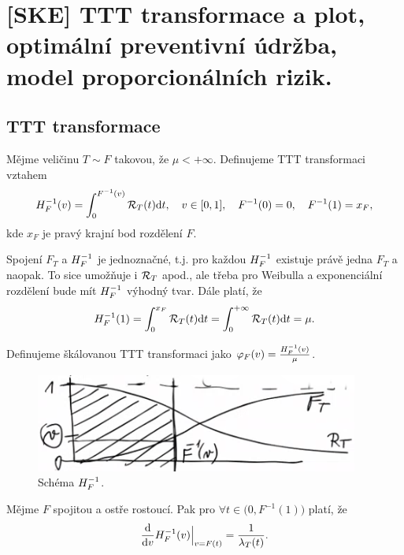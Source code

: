 \chapter{[SKE] TTT transformace a plot, optimální preventivní údržba, model proporcionálních rizik.}


\section{TTT transformace}

    \begin{define}
    Mějme veličinu $T\sim F$ takovou, že $\mu<+\infty$. Definujeme TTT transformaci vztahem $$ H_F^{-1}(v)=\int_{0}^{F^{-1}(v)}\mathcal{R}_T(t)\mathrm{d} t,\quad v\in[0,1],\quad F^{-1}(0)=0,\quad F^{-1}(1)=x_F,$$
    kde $x_F$ je pravý krajní bod rozdělení $F$.
    \end{define}

    \begin{remark}
        Spojení $F_T$ a $H_F^{-1}$ je jednoznačné, t.j. pro každou $H_F^{-1}$ existuje právě jedna $F_T$ a naopak. To sice umožňuje i $\mathcal{R}_T$ apod., ale třeba pro Weibulla a exponenciální rozdělení bude mít $H_F^{-1}$ výhodný tvar.
        Dále platí, že $$ H_F^{-1}(1) = \int_{0}^{x_F}\mathcal{R}_T(t)\mathrm{d} t=\int_{0}^{+\infty}\mathcal{R}_T(t)\mathrm{d} t=\mu. $$
    \end{remark}

    \begin{define}
        Definujeme škálovanou TTT transformaci jako $\varphi_F(v)=\frac{H_F^{-1}(v)}{\mu}$.
    \end{define}

    \begin{figure}[h]
        \centering
        \includegraphics[width=0.4\linewidth]{pictures/TTT}
        \caption{Schéma $H_F^{-1}$.}
        \label{fig:TTT}
    \end{figure}



    \begin{theorem}
        Mějme $F$ spojitou a ostře rostoucí. Pak pro $\forall t\in\big(0,F^{-1}(1)\big)$ platí, že $$\frac{\mathrm{d}}{\mathrm{d} v}H_F^{-1}(v)\Big|_{v=F(t)}=\frac{1}{\lambda_T(t)}.$$
    \end{theorem}

